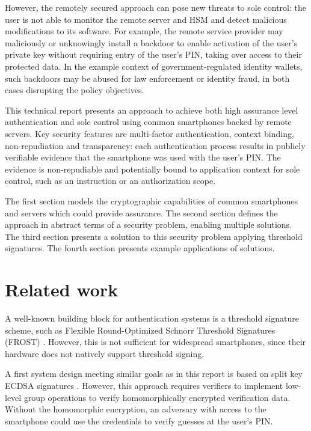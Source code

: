 \documentclass[a4paper]{article}
\begin{document}
However, the remotely secured approach can pose new threats to sole control: the user is not able to monitor the remote server and HSM and detect malicious modifications to its software. For example, the remote service provider may maliciously or unknowingly install a backdoor to enable activation of the user’s private key without requiring entry of the user’s PIN, taking over access to their protected data. In the example context of government-regulated identity wallets, such backdoors may be abused for law enforcement or identity fraud, in both cases disrupting the policy objectives.

This technical report presents an approach to achieve both high assurance level authentication and sole control using common smartphones backed by remote servers. Key security features are multi-factor authentication, context binding, non-repudiation and transparency: each authentication process results in publicly verifiable evidence that the smartphone was used with the user’s PIN. The evidence is non-repudiable and potentially bound to application context for sole control, such as an instruction or an authorization scope.

The first section models the cryptographic capabilities of common smartphones and servers which could provide assurance. The second section defines the approach in abstract terms of a security problem, enabling multiple solutions. The third section presents a solution to this security problem applying threshold signatures. The fourth section presents example applications of solutions.

\section{Related work}

A well-known building block for authentication systems is a threshold signature scheme, such as Flexible Round-Optimized Schnorr Threshold Signatures (FROST) \cite{cryptoeprint:2020/852}. However, this is not sufficient for widespread smartphones, since their hardware does not natively support threshold signing.

A first system design meeting similar goals as in this report is based on split key ECDSA signatures \cite{Verheul2024}. However, this approach requires verifiers to implement low-level group operations to verify homomorphically encrypted verification data. Without the homomorphic encryption, an adversary with access to the smartphone could use the credentials to verify guesses at the user’s PIN.
\end{document}
